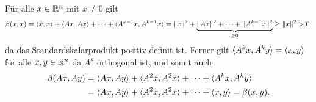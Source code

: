\section{}





\subsection{}

Für alle $x \in \mathbb{R}^n$ mit $x \neq 0$ gilt
\[
        \beta(x,x)
  =     \langle x, x \rangle + \langle A x, A x \rangle + \dotsb + \langle A^{k-1} x, A^{k-1} x \rangle
  =     \|x\|^2 + \underbrace{ \|A x\|^2 + \dotsb + \|A^{k-1} x\|^2 }_{\geq 0}
  \geq  \|x\|^2
  >     0,
\]
da das Standardskalarprodukt positiv definit ist.
Ferner gilt $\langle A^k x, A^k y \rangle = \langle x, y \rangle$ für alle $x, y \in \mathbb{R}^n$ da $A^k$ orthogonal ist, und somit auch
\begin{align*}
     \beta(A x, A y)
  &= \langle A x, A y \rangle + \langle A^2 x, A^2 x \rangle + \dotsb + \langle A^k x, A^k y \rangle
  \\
  &= \langle A x, A y \rangle + \langle A^2 x, A^2 x \rangle + \dotsb + \langle x, y \rangle
   = \beta(x, y).
\end{align*}


